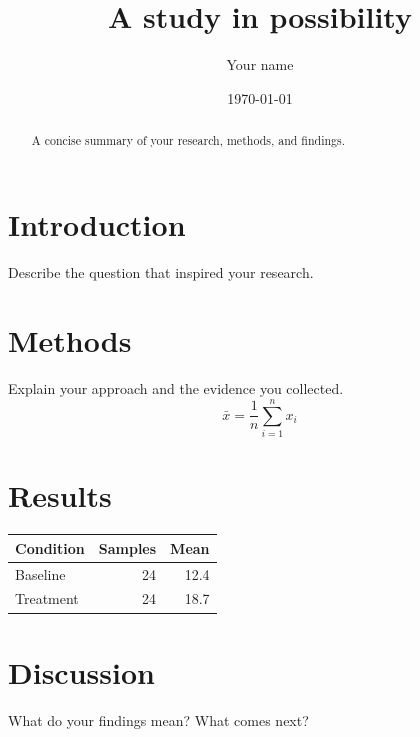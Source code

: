 \documentclass[11pt,a4paper]{article}
\title{A study in possibility}
\author{Your name}
\date{\today}
\begin{document}
\maketitle
\begin{abstract}
A concise summary of your research, methods, and findings.
\end{abstract}
\tableofcontents
\section{Introduction}
Describe the question that inspired your research.
\section{Methods}
Explain your approach and the evidence you collected.
\begin{equation}
\bar{x} = \frac{1}{n}\sum_{i=1}^{n} x_i
\end{equation}
\section{Results}
\begin{center}
\begin{tabular}{lrr}
\toprule
Condition & Samples & Mean \\
\midrule
Baseline & 24 & 12.4 \\
Treatment & 24 & 18.7 \\
\bottomrule
\end{tabular}
\end{center}
\section{Discussion}
What do your findings mean? What comes next?
\end{document}
